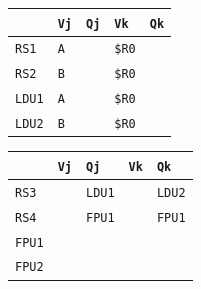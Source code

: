 \begin{enumerate}
    \begin{minipage}{0.45\textwidth}
        \centering
        \begin{tabular}{@{} l | l l l l @{}}
            \toprule
                & \texttt{Vj} & \texttt{Qj} & \texttt{Vk} & \texttt{Qk} \\
            \midrule
            \texttt{RS1} & \texttt{A} & & \texttt{\$R0} & \\ [.3em]
            \texttt{RS2} & \texttt{B} & & \texttt{\$R0} & \\
            \cmidrule{1-5}
            \texttt{LDU1} & \texttt{A} & & \texttt{\$R0} & \\ [.3em]
            \texttt{LDU2} & \texttt{B} & & \texttt{\$R0} & \\
            \bottomrule
        \end{tabular}
    \end{minipage}
    \hfill
    \begin{minipage}{0.45\textwidth}
        \centering
        \begin{tabular}{@{} l | l l l l @{}}
            \toprule
            & \texttt{Vj} & \texttt{Qj} & \texttt{Vk} & \texttt{Qk} \\
            \midrule
            \texttt{RS3} & & \texttt{LDU1} & & \texttt{LDU2} \\ [.3em]
            \texttt{RS4} & & \texttt{FPU1} & & \texttt{FPU1} \\
            \cmidrule{1-5}
            \texttt{FPU1} & & & & \\ [.3em]
            \texttt{FPU2} & & & & \\
            \bottomrule
        \end{tabular}
    \end{minipage}


\end{enumerate}
